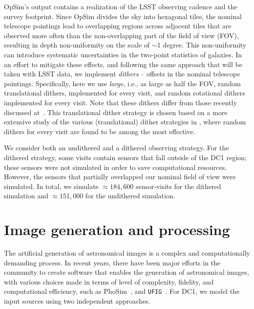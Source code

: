 \documentclass[\docopts]{\docclass}
\begin{document}
OpSim's output contains a realization of the LSST observing cadence and the survey footprint. Since OpSim divides the sky into hexagonal tiles, the nominal telescope pointings lead to overlapping regions across adjacent tiles that are observed more often than the non-overlapping part of the field of view (FOV), resulting in depth non-uniformity on the scale of $\sim$1 degree. This non-uniformity can introduce systematic uncertainties in the two-point statistics of galaxies\citep{2016ApJ...829...50A}. In an effort to mitigate these effects, and following the same approach that will be taken with LSST data, we implement \textit{dithers} -- offsets in the nominal telescope pointings. Specifically, here we use \textit{large}, i.e., as large as half the FOV, random translational dithers, implemented for every visit, and random rotational dithers implemented for every visit. Note that these dithers differ from those recently discussed at~\citet{2018arXiv181200515L}. This translational dither strategy is chosen based on a more extensive study of the various (translational) dither strategies in \citet{2016ApJ...829...50A}, where random dithers for every visit are found to be among the most effective.

We consider both an undithered and a dithered observing strategy. For the dithered strategy, some visits contain sensors that fall outside of the DC1 region; these sensors were not simulated in order to save computational resources. However, the sensors that partially overlapped our nominal field of view were simulated. In total, we simulate $\approx 184,600$ sensor-visits for the dithered simulation and $\approx 151,000$ for the undithered simulation.




\section{Image generation and processing}
\label{sec:image_generation_pipeline}

The artificial generation of astronomical images is a complex and computationally demanding process. In recent
years, there have been major efforts in the community to create software that enables the generation of astronomical images, with various choices made in terms of level of complexity, fidelity, and computational efficiency, such as PhoSim~\citep{2015ApJS..218...14P}, and \texttt{UFIG}~\citep{2016ApJ...817...25B}. For DC1, we model the input sources using
two independent approaches. 
\end{document}
